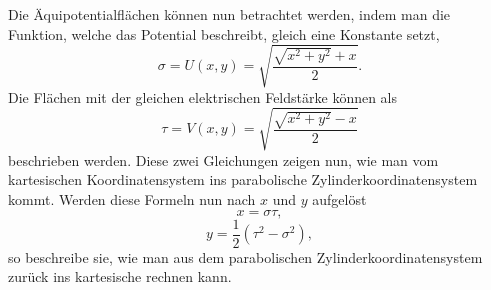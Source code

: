 Die Äquipotentialflächen können nun betrachtet werden, 
indem man die Funktion, welche das Potential beschreibt, gleich eine Konstante setzt,
\begin{equation}
	\sigma = U(x,y) = \sqrt{\frac{\sqrt{x^2+y^2} + x}{2}}.
\end{equation}
Die Flächen mit der gleichen elektrischen Feldstärke können als
\begin{equation}
	\tau = V(x,y) = \sqrt{\frac{\sqrt{x^2+y^2} - x}{2}}
\end{equation}
beschrieben werden. Diese zwei Gleichungen zeigen nun, wie man vom 
kartesischen Koordinatensystem ins parabolische Zylinderkoordinatensystem kommt. 
Werden diese Formeln nun nach $x$ und $y$ aufgelöst 
\begin{equation}
	x = \sigma \tau,
\end{equation}
\begin{equation}
	y = \frac{1}{2}\left ( \tau^2 - \sigma^2 \right ),
\end{equation}
so beschreibe sie, wie man aus dem parabolischen Zylinderkoordinatensystem zurück ins kartesische rechnen kann.
